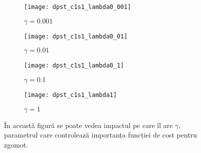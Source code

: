 \begin{figure}[h]
	\centering
    \begin{subfigure}[b]{0.24\textwidth}
		\centering
        \texttt{[image: dpst\_c1s1\_lambda0\_001]}
        \label{fig:dpst_c1s1_lambda0_001}
        \caption{$\gamma = 0.001$}
	\end{subfigure}
    \hfill
    \begin{subfigure}[b]{0.24\textwidth}
		\centering
        \texttt{[image: dpst\_c1s1\_lambda0\_01]}
        \label{fig:dpst_c1s1_lambda0_01}
        \caption{$\gamma = 0.01$}
	\end{subfigure}
    \hfill
    \begin{subfigure}[b]{0.24\textwidth}
		\centering
        \texttt{[image: dpst\_c1s1\_lambda0\_1]}
        \label{fig:dpst_c1s1_lambda0_1}
        \caption{$\gamma = 0.1$}
	\end{subfigure}
    \hfill
    \begin{subfigure}[b]{0.24\textwidth}
		\centering
        \texttt{[image: dpst\_c1s1\_lambda1]}
        \label{fig:dpst_c1s1_lambda1}
        \caption{$\gamma = 1$}
	\end{subfigure}
    \caption{În această figură se poate vedea impactul pe care îl are $\gamma$, parametrul care controlează importanța funcției de cost pentru zgomot.}
\end{figure}